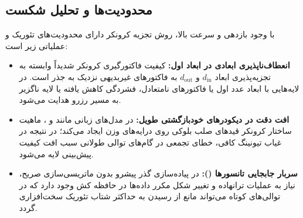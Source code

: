 \subsection{محدودیت‌ها و تحلیل شکست}
با وجود بازدهی و سرعت بالا، روش تجزیه کرونکر دارای محدودیت‌های تئوریک و عملیاتی زیر است:
\begin{itemize}
    \item \textbf{انعطاف‌ناپذیری ابعادی در ابعاد اول:} کیفیت فاکتورگیری کرونکر شدیداً وابسته به تجزیه‌پذیری ابعاد $d_{\text{in}}$ و $d_{\text{out}}$ به فاکتورهای غیربدیهی نزدیک به جذر است. در لایه‌هایی با ابعاد عدد اول یا فاکتورهای نامتعادل، فشردگی کاهش یافته یا لایه ناگزیر به مسیر رزرو  هدایت می‌شود.
    \item \textbf{افت دقت در دیکودرهای خودبازگشتی طویل:} در مدل‌های زبانی مانند  و ، ماهیت ساختار کرونکر قیدهای صلب بلوکی روی درایه‌های وزن ایجاد می‌کند؛ در نتیجه در غیاب تیونینگ کافی، خطای تجمعی در گام‌های توالی طولانی سبب افت کیفیت پیش‌بینی لایه  می‌شود.
    \item \textbf{سربار جابجایی تانسورها ():} در پیاده‌سازی گذر پیشرو بدون ماتریسی‌سازی صریح، نیاز به عملیات ترانهاده و تغییر شکل مکرر داده‌ها در حافظه کش وجود دارد که در توالی‌های کوتاه می‌تواند مانع از رسیدن به حداکثر شتاب تئوریک سخت‌افزاری گردد.
\end{itemize}

